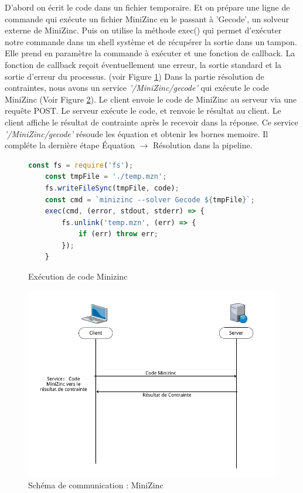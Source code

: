 \documentclass[12pt]{article}
\begin{document}
 D'abord on écrit le code dans un fichier temporaire. Et on prépare une ligne de commande qui exécute un fichier MiniZinc en le passant à 'Gecode', un solveur externe de MiniZinc. Puis on utilise la méthode exec() qui permet d'exécuter notre commande dans un shell système et de récupérer la sortie dans un tampon. Elle prend en paramètre la commande à exécuter et une fonction de callback. La fonction de callback reçoit éventuellement une erreur, la sortie standard et la sortie d'erreur du processus. (voir Figure \ref{fig10}) Dans la partie résolution de contraintes, nous avons un service \emph{'/MiniZinc/gecode'} qui exécute le code MiniZinc (Voir Figure \ref{fig11}). Le client envoie le code de MiniZinc au serveur via une requête POST. Le serveur exécute le code, et renvoie le résultat au client. Le client affiche le résultat de contrainte après le recevoir dans la réponse. Ce service \emph{'/MiniZinc/gecode'} résoude les équation et obtenir les bornes memoire. Il compléte la dernière étape Équation $\rightarrow$ Résolution dans la pipeline. 

\begin{figure}
      \centering
      \begin{lstlisting}[language=javascript]
    const fs = require('fs');
    const tmpFile = './temp.mzn';
    fs.writeFileSync(tmpFile, code);
    const cmd = `minizinc --solver Gecode ${tmpFile}`;
    exec(cmd, (error, stdout, stderr) => {
        fs.unlink('temp.mzn', (err) => {
            if (err) throw err;
        });
    }
\end{lstlisting}
      \caption{Exécution de code Minizinc\label{fig10}}
\end{figure}



\begin{figure}
      \centering
      \includegraphics[scale=0.5]{Figures/CommunicationMiniZinc.png}
      \caption{Schéma de communication : MiniZinc\label{fig11}}
\end{figure}
\end{document}
